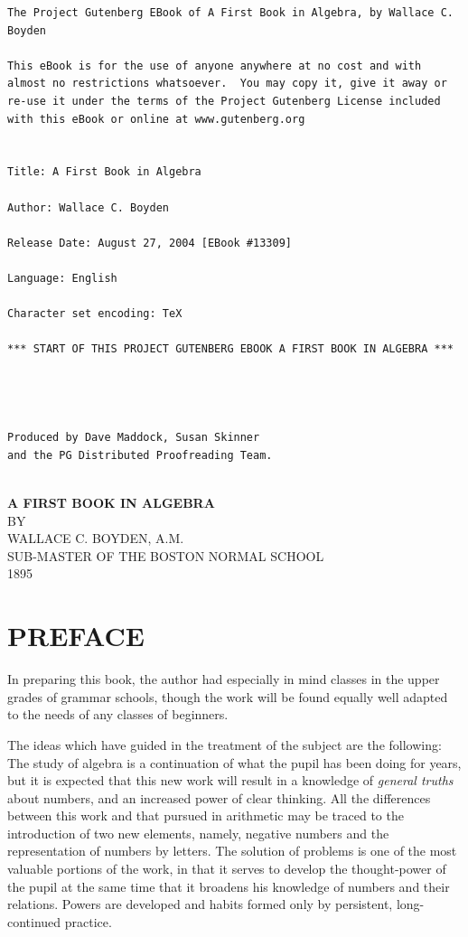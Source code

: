 \documentclass{book}
\begin{document}
\thispagestyle{empty}
\small
\begin{verbatim}
The Project Gutenberg EBook of A First Book in Algebra, by Wallace C. Boyden

This eBook is for the use of anyone anywhere at no cost and with
almost no restrictions whatsoever.  You may copy it, give it away or
re-use it under the terms of the Project Gutenberg License included
with this eBook or online at www.gutenberg.org


Title: A First Book in Algebra

Author: Wallace C. Boyden

Release Date: August 27, 2004 [EBook #13309]

Language: English

Character set encoding: TeX

*** START OF THIS PROJECT GUTENBERG EBOOK A FIRST BOOK IN ALGEBRA ***




Produced by Dave Maddock, Susan Skinner
and the PG Distributed Proofreading Team.


\end{verbatim}
\normalsize
\newpage

\begin{titlepage}
  \begin{center}
    {\LARGE\bfseries A FIRST BOOK IN ALGEBRA}\\[2.5cm]
    BY\\[2.5cm]
    {\Large WALLACE C. BOYDEN, A.M.}\\[3cm]
    {\large SUB-MASTER OF THE BOSTON NORMAL SCHOOL}\\[1cm]
    \textsc{1895}
  \end{center}
\end{titlepage}

\section*{PREFACE}

In preparing this book, the author had especially in mind classes
in the upper grades of grammar schools, though the work will be
found equally well adapted to the needs of any classes of
beginners.

The ideas which have guided in the treatment of the subject are
the following: The study of algebra is a continuation of what the
pupil has been doing for years, but it is expected that this new
work will result in a knowledge of \textit{ general truths} about
numbers, and an increased power of clear thinking. All the
differences between this work and that pursued in arithmetic may
be traced to the introduction of two new elements, namely,
negative numbers and the representation of numbers by letters. The
solution of problems is one of the most valuable portions of the
work, in that it serves to develop the thought-power of the pupil
at the same time that it broadens his knowledge of numbers and
their relations. Powers are developed and habits formed only by
persistent, long-continued practice.
\end{document}
